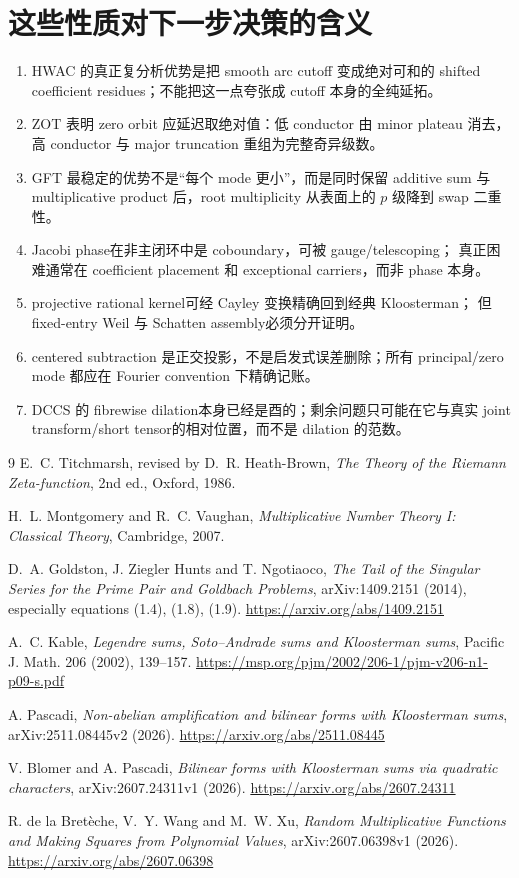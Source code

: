 \documentclass[11pt,a4paper]{ctexart}
\theoremstyle{definition}
\newcommand{\1}{\mathbf 1}
\begin{document}
\section{这些性质对下一步决策的含义}

\begin{enumerate}
\item HWAC 的真正复分析优势是把 smooth arc cutoff 变成绝对可和的 shifted
coefficient residues；不能把这一点夸张成 cutoff 本身的全纯延拓。
\item ZOT 表明 zero orbit 应延迟取绝对值：低 conductor 由 minor plateau
消去，高 conductor 与 major truncation 重组为完整奇异级数。
\item GFT 最稳定的优势不是“每个 mode 更小”，而是同时保留 additive sum 与
multiplicative product 后，root multiplicity 从表面上的 $p$ 级降到 swap 二重性。
\item Jacobi phase在非主闭环中是 coboundary，可被 gauge/telescoping；
真正困难通常在 coefficient placement 和 exceptional carriers，而非 phase 本身。
\item projective rational kernel可经 Cayley 变换精确回到经典 Kloosterman；
但 fixed-entry Weil 与 Schatten assembly必须分开证明。
\item centered subtraction 是正交投影，不是启发式误差删除；所有 principal/zero
mode 都应在 Fourier convention 下精确记账。
\item DCCS 的 fibrewise dilation本身已经是酉的；剩余问题只可能在它与真实
joint transform/short tensor的相对位置，而不是 dilation 的范数。
\end{enumerate}

\begin{thebibliography}{9}
E.~C. Titchmarsh, revised by D.~R. Heath-Brown,
\emph{The Theory of the Riemann Zeta-function}, 2nd ed., Oxford, 1986.

H.~L. Montgomery and R.~C. Vaughan,
\emph{Multiplicative Number Theory I: Classical Theory}, Cambridge, 2007.

D.~A. Goldston, J. Ziegler Hunts and T. Ngotiaoco,
\emph{The Tail of the Singular Series for the Prime Pair and Goldbach Problems},
arXiv:1409.2151 (2014), especially equations (1.4), (1.8), (1.9).
\url{https://arxiv.org/abs/1409.2151}

A.~C. Kable,
\emph{Legendre sums, Soto--Andrade sums and Kloosterman sums},
Pacific J. Math. 206 (2002), 139--157.
\url{https://msp.org/pjm/2002/206-1/pjm-v206-n1-p09-s.pdf}

A. Pascadi,
\emph{Non-abelian amplification and bilinear forms with Kloosterman sums},
arXiv:2511.08445v2 (2026).
\url{https://arxiv.org/abs/2511.08445}

V. Blomer and A. Pascadi,
\emph{Bilinear forms with Kloosterman sums via quadratic characters},
arXiv:2607.24311v1 (2026).
\url{https://arxiv.org/abs/2607.24311}

R. de la Bret\`eche, V.~Y. Wang and M.~W. Xu,
\emph{Random Multiplicative Functions and Making Squares from Polynomial Values},
arXiv:2607.06398v1 (2026).
\url{https://arxiv.org/abs/2607.06398}
\end{thebibliography}
\end{document}
